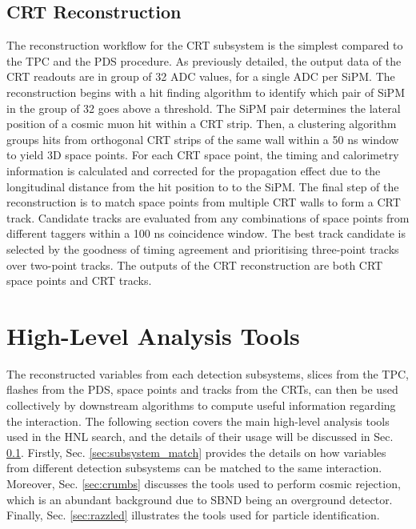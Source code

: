 \subsection{CRT Reconstruction}

The reconstruction workflow for the CRT subsystem is the simplest compared to the TPC and the PDS procedure.
As previously detailed, the output data of the CRT readouts are in group of 32 ADC values, for a single ADC per SiPM.
The reconstruction begins with a hit finding algorithm to identify which pair of SiPM in the group of 32 goes above a threshold.
The SiPM pair determines the lateral position of a cosmic muon hit within a CRT strip.
Then, a clustering algorithm groups hits from orthogonal CRT strips of the same wall within a 50 ns window to yield 3D space points.
For each CRT space point, the timing and calorimetry information is calculated and corrected for the propagation effect due to the longitudinal distance from the hit position to to the SiPM.
The final step of the reconstruction is to match space points from multiple CRT walls to form a CRT track.
Candidate tracks are evaluated from any combinations of space points from different taggers within a 100 ns coincidence window.
The best track candidate is selected by the goodness of timing agreement and prioritising three-point tracks over two-point tracks. 
The outputs of the CRT reconstruction are both CRT space points and CRT tracks. 

\section{High-Level Analysis Tools}
\label{sec:reco_ana_tools}

The reconstructed variables from each detection subsystems, slices from the TPC, flashes from the PDS, space points and tracks from the CRTs, can then be used collectively by downstream algorithms to compute useful information regarding the interaction.
The following section covers the main high-level analysis tools used in the HNL search, and the details of their usage will be discussed in Sec. \ref{}.
Firstly, Sec. \ref{sec:subsystem_match} provides the details on how variables from different detection subsystems can be matched to the same interaction.
Moreover, Sec. \ref{sec:crumbs} discusses the tools used to perform cosmic rejection, which is an abundant background due to SBND being an overground detector.
Finally, Sec. \ref{sec:razzled} illustrates the tools used for particle identification. 

